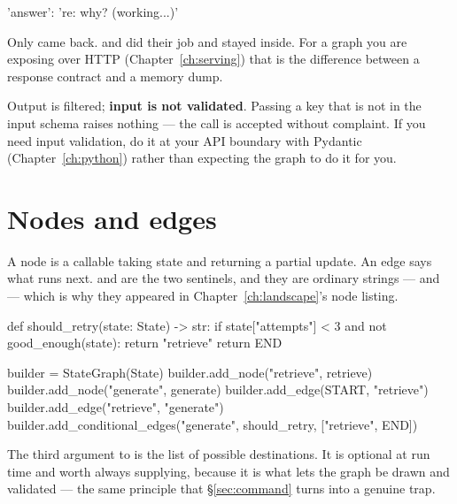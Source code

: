 \begin{console}
{'answer': 're: why? (working...)'}
\end{console}

Only  came back.  and  did their job and
stayed inside. For a graph you are exposing over HTTP
(Chapter~\ref{ch:serving}) that is the difference between a response contract and
a memory dump.

\begin{warning}
Output is filtered; \textbf{input is not validated}. Passing a key that is not in
the input schema raises nothing --- the call is accepted without complaint. If
you need input validation, do it at your API boundary with Pydantic
(Chapter~\ref{ch:python}) rather than expecting the graph to do it for you.
\end{warning}

\section{Nodes and edges}
\label{sec:nodes-edges}

A node is a callable taking state and returning a partial update. An edge says
what runs next.  and  are the two sentinels, and they are
ordinary strings ---  and  --- which is
why they appeared in Chapter~\ref{ch:landscape}'s node listing.

\begin{python}[caption={A graph with a retry loop}, label={lst:conditional-edge}]
def should_retry(state: State) -> str:
    if state["attempts"] < 3 and not good_enough(state):
        return "retrieve"
    return END


builder = StateGraph(State)
builder.add_node("retrieve", retrieve)
builder.add_node("generate", generate)
builder.add_edge(START, "retrieve")
builder.add_edge("retrieve", "generate")
builder.add_conditional_edges("generate", should_retry, ["retrieve", END])
\end{python}

The third argument to  is the list of possible
destinations. It is optional at run time and worth always supplying, because it
is what lets the graph be drawn and validated --- the same principle that
\S\ref{sec:command} turns into a genuine trap.

